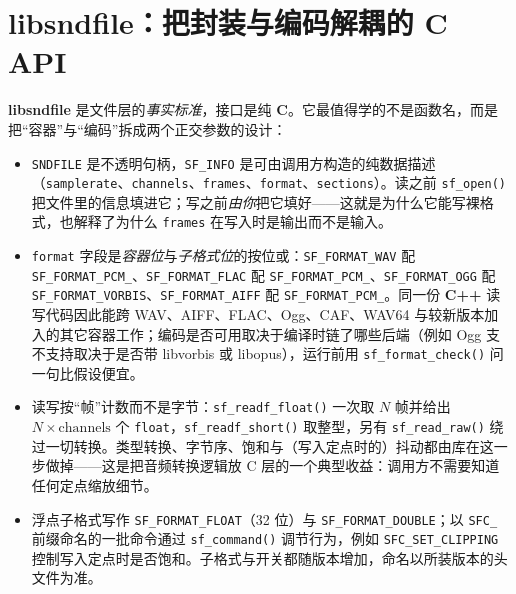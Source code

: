 \documentclass[12pt,a4paper,fontset=fandol]{ctexbook}
\newcommand{\Fn}[1]{\texttt{#1()}}
\newcommand{\Tp}[1]{\texttt{#1}}
\newcommand{\Bk}{\allowbreak}
\newcommand{\Lib}[1]{\textbf{#1}}
\newcommand{\Lang}[1]{\textsf{\bfseries #1}}
\newcommand{\CL}{\Lang{C}}
\newcommand{\CPP}{\Lang{C++}}
\begin{document}
\section{\Lib{libsndfile}：把封装与编码解耦的 C API}

\Lib{libsndfile} 是文件层的\emph{事实标准}，接口是纯 \CL{}。它最值得学的不是函数名，而是把``容器''与``编码''拆成两个正交参数的设计：

\begin{itemize}
\item \Tp{SNDFILE} 是不透明句柄，\Tp{SF\_INFO} 是可由调用方构造的纯数据描述（\Tp{samplerate}、\Tp{channels}、\Tp{frames}、\Tp{format}、\Tp{sections}）。读之前 \Fn{sf\_open} 把文件里的信息填进它；写之前\emph{由你}把它填好——这就是为什么它能写裸格式，也解释了为什么 \Tp{frames} 在写入时是输出而不是输入。
\item \Tp{format} 字段是\emph{容器位}与\emph{子格式位}的按位或：\Tp{SF\_\Bk FORMAT\_\Bk WAV} 配 \Tp{SF\_\Bk FORMAT\_\Bk PCM\_\Bk 16}、\Tp{SF\_\Bk FORMAT\_\Bk FLAC} 配 \Tp{SF\_\Bk FORMAT\_\Bk PCM\_\Bk 16}、\Tp{SF\_\Bk FORMAT\_\Bk OGG} 配 \Tp{SF\_\Bk FORMAT\_\Bk VORBIS}、\Tp{SF\_\Bk FORMAT\_\Bk AIFF} 配 \Tp{SF\_\Bk FORMAT\_\Bk PCM\_\Bk 24}。同一份 \CPP{} 读写代码因此能跨 WAV、AIFF、FLAC、Ogg、CAF、WAV64 与较新版本加入的其它容器工作；编码是否可用取决于编译时链了哪些后端（例如 Ogg 支不支持取决于是否带 libvorbis 或 libopus），运行前用 \Fn{sf\_format\_check} 问一句比假设便宜。
\item 读写按``帧''计数而不是字节：\Fn{sf\_readf\_float} 一次取 $N$ 帧并给出 $N \times \text{channels}$ 个 \Tp{float}，\Fn{sf\_readf\_short} 取整型，另有 \Fn{sf\_read\_raw} 绕过一切转换。类型转换、字节序、饱和与（写入定点时的）抖动都由库在这一步做掉——这是把音频转换逻辑放 C 层的一个典型收益：调用方不需要知道任何定点缩放细节。
\item 浮点子格式写作 \Tp{SF\_\Bk FORMAT\_\Bk FLOAT}（32 位）与 \Tp{SF\_\Bk FORMAT\_\Bk DOUBLE}；以 \Tp{SFC\_\Bk} 前缀命名的一批命令通过 \Fn{sf\_command} 调节行为，例如 \Tp{SFC\_\Bk SET\_\Bk CLIPPING} 控制写入定点时是否饱和。子格式与开关都随版本增加，命名以所装版本的头文件为准。
\end{itemize}
\end{document}
